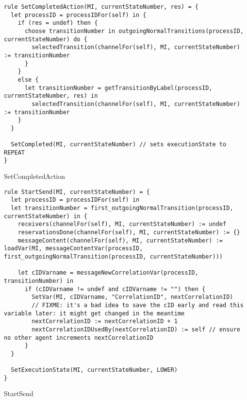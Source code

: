\begin{listing}[H]
\begin{verbatim}
rule SetCompletedAction(MI, currentStateNumber, res) = {
  let processID = processIDFor(self) in {
    if (res = undef) then {
      choose transitionNumber in outgoingNormalTransitions(processID, currentStateNumber) do {
        selectedTransition(channelFor(self), MI, currentStateNumber) := transitionNumber
      }
    }
    else {
      let transitionNumber = getTransitionByLabel(processID, currentStateNumber, res) in
        selectedTransition(channelFor(self), MI, currentStateNumber) := transitionNumber
    }
  }

  SetCompleted(MI, currentStateNumber) // sets executionState to REPEAT
}
\end{verbatim}
\caption{SetCompletedAction}
\label{lst:asm:SetCompletedAction}
\end{listing}





\begin{listing}[H]
\begin{verbatim}
rule StartSend(MI, currentStateNumber) = {
  let processID = processIDFor(self) in
  let transitionNumber = first_outgoingNormalTransition(processID, currentStateNumber) in {
    receivers(channelFor(self), MI, currentStateNumber) := undef
    reservationsDone(channelFor(self), MI, currentStateNumber) := {}
    messageContent(channelFor(self), MI, currentStateNumber) := loadVar(MI, messageContentVar(processID, first_outgoingNormalTransition(processID, currentStateNumber)))

    let cIDVarname = messageNewCorrelationVar(processID, transitionNumber) in
      if (cIDVarname != undef and cIDVarname != "") then {
        SetVar(MI, cIDVarname, "CorrelationID", nextCorrelationID)
        // FIXME: it's a bad idea to save the cID early and read this variable later: it might get changed in the meantime
        nextCorrelationID := nextCorrelationID + 1
        nextCorrelationIDUsedBy(nextCorrelationID) := self // ensure no other agent increments nextCorrelationID
      }
  }

  SetExecutionState(MI, currentStateNumber, LOWER)
}
\end{verbatim}
\caption{StartSend}
\label{lst:asm:StartSend}
\end{listing}




